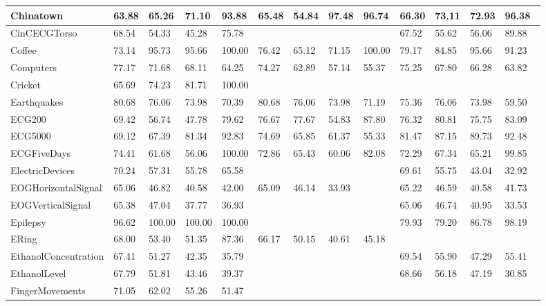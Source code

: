 \begin{landscape}
\begin{longtable}{|l|llll|llll|llll|}
      Chinatown & 63.88 & 65.26 & 71.10 & 93.88 & 65.48 & 54.84 & 97.48 & 96.74 & 66.30 & 73.11 & 72.93 & 96.38 \\ \hline
      CinCECGTorso & 68.54 & 54.33 & 45.28 & 75.78 &   &   &   &   & 67.52 & 55.62 & 56.06 & 89.88 \\ \hline
      Coffee & 73.14 & 95.73 & 95.66 & 100.00 & 76.42 & 65.12 & 71.15 & 100.00 & 79.17 & 84.85 & 95.66 & 91.23 \\ \hline
      Computers & 77.17 & 71.68 & 68.11 & 64.25 & 74.27 & 62.89 & 57.14 & 55.37 & 75.25 & 67.80 & 66.28 & 63.82 \\ \hline
      Cricket & 65.69 & 74.23 & 81.71 & 100.00 &   &   &   &   &   &   &   &   \\ \hline
      Earthquakes & 80.68 & 76.06 & 73.98 & 70.39 & 80.68 & 76.06 & 73.98 & 71.19 & 75.36 & 76.06 & 73.98 & 59.50 \\ \hline
      ECG200 & 69.42 & 56.74 & 47.78 & 79.62 & 76.67 & 77.67 & 54.83 & 87.80 & 76.32 & 80.81 & 75.75 & 83.09 \\ \hline
      ECG5000 & 69.12 & 67.39 & 81.34 & 92.83 & 74.69 & 65.85 & 61.37 & 55.33 & 81.47 & 87.15 & 89.73 & 92.48 \\ \hline
      ECGFiveDays & 74.41 & 61.68 & 56.06 & 100.00 & 72.86 & 65.43 & 60.06 & 82.08 & 72.29 & 67.34 & 65.21 & 99.85 \\ \hline
      ElectricDevices & 70.24 & 57.31 & 55.78 & 65.58 &   &   &   &   & 69.61 & 55.75 & 43.04 & 32.92 \\ \hline
      EOGHorizontalSignal & 65.06 & 46.82 & 40.58 & 42.00 & 65.09 & 46.14 & 33.93 &   & 65.22 & 46.59 & 40.58 & 41.73 \\ \hline
      EOGVerticalSignal & 65.38 & 47.04 & 37.77 & 36.93 &   &   &   &   & 65.06 & 46.74 & 40.95 & 33.53 \\ \hline
      Epilepsy & 96.62 & 100.00 & 100.00 & 100.00 &   &   &   &   & 79.93 & 79.20 & 86.78 & 98.19 \\ \hline
      ERing & 68.00 & 53.40 & 51.35 & 87.36 & 66.17 & 50.15 & 40.61 & 45.18 &   &   &   &   \\ \hline
      EthanolConcentration & 67.41 & 51.27 & 42.35 & 35.79 &   &   &   &   & 69.54 & 55.90 & 47.29 & 55.41 \\ \hline
      EthanolLevel & 67.79 & 51.81 & 43.46 & 39.37 &   &   &   &   & 68.66 & 56.18 & 47.19 & 30.85 \\ \hline
      FingerMovements & 71.05 & 62.02 & 55.26 & 51.47 &   &   &   &   &   &   &   &   \\ \hline

\end{longtable}
\end{landscape}
